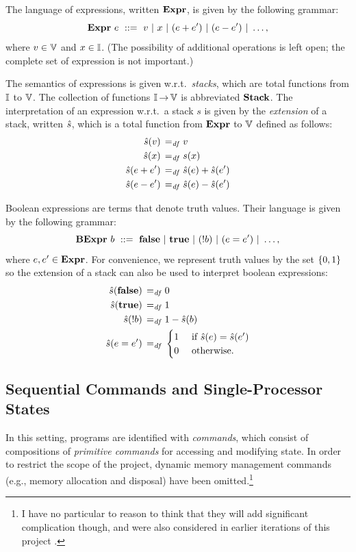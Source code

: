 \documentclass[11pt]{report}
\begin{document}
The language of expressions, written $\mathbf{Expr}$, is given by the following grammar: \[ \mathbf{Expr}~e ~::=~ v ~|~ x ~|~ (e + e') ~|~ (e - e') ~|~ \ldots, \] where $v \in \mathbb{V}$ and $x \in \mathbb{I}$. (The possibility of additional operations is left open; the complete set of expression is not important.)

The semantics of expressions is given w.r.t.~\emph{stacks}, which are total functions from $\mathbb{I}$ to $\mathbb{V}$. The collection of functions $\mathbb{I} \operatorname{\rightarrow} \mathbb{V}$ is abbreviated $\mathbf{Stack}$. The interpretation of an expression w.r.t.~a stack $s$ is given by the \emph{extension} of a stack, written $\hat{s}$, which is a total function from $\mathbf{Expr}$ to $\mathbb{V}$ defined as follows: \begin{align*}
    \hat{s}(v) \operatorname{\;=_{\mathit{df}}\;} & v \\
    \hat{s}(x) \operatorname{\;=_{\mathit{df}}\;} & s(x) \\
    \hat{s}(e + e') \operatorname{\;=_{\mathit{df}}\;} & \hat{s}(e) + \hat{s}(e') \\
    \hat{s}(e - e') \operatorname{\;=_{\mathit{df}}\;} & \hat{s}(e) - \hat{s}(e')
\end{align*}  

Boolean expressions are terms that denote truth values. Their language is given by the following grammar: \[ \mathbf{BExpr}~b ~::=~ \mathbf{false} ~|~ \mathbf{true} ~|~ (!b) ~|~ (e = e') ~|~ \ldots, \] where $e,e' \in \mathbf{Expr}$. For convenience, we represent truth values by the set $\left\lbrace 0,1 \right\rbrace$ so the extension of a stack can also be used to interpret boolean expressions: \begin{align*}
    \hat{s}(\mathbf{false}) \operatorname{\;=_{\mathit{df}}\;} & 0 \\
    \hat{s}(\mathbf{true}) \operatorname{\;=_{\mathit{df}}\;} & 1 \\
    \hat{s}(!b) \operatorname{\;=_{\mathit{df}}\;} & 1 - \hat{s}(b) \\
    \hat{s}(e = e') \operatorname{\;=_{\mathit{df}}\;} & \begin{cases}
        1 &\text{ if } \hat{s}(e) = \hat{s}(e')\\
        0 &\text{ otherwise.}
    \end{cases}
\end{align*}

\subsection{Sequential Commands and Single-Processor States}
\label{sec:sequential-commands}

In this setting, programs are identified with \emph{commands}, which consist of compositions of \emph{primitive commands} for accessing and modifying state. In order to restrict the scope of the project, dynamic memory management commands (e.g., memory allocation and disposal) have been omitted.\footnote{I have no particular to reason to think that they will add significant complication though, and were also considered in earlier iterations of this project \cite{wmsldetails,lola11}.}
\end{document}
